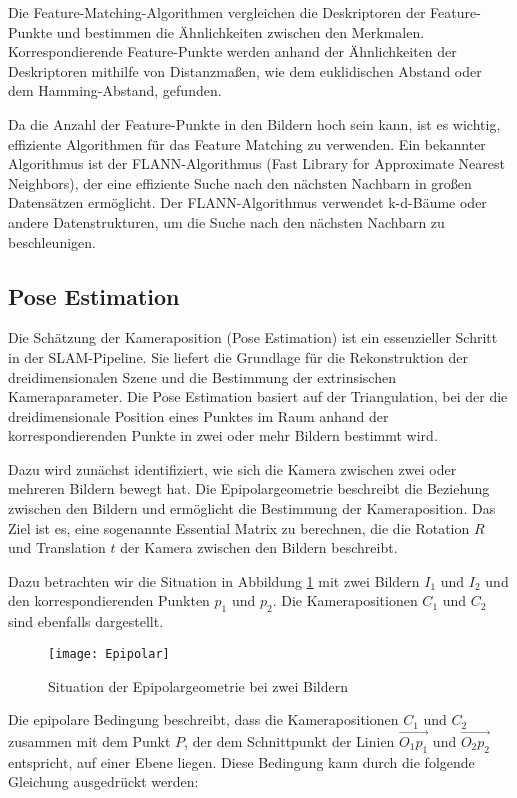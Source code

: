Die Feature-Matching-Algorithmen vergleichen die Deskriptoren der Feature-Punkte und bestimmen die Ähnlichkeiten zwischen den Merkmalen. Korrespondierende Feature-Punkte werden anhand der Ähnlichkeiten der Deskriptoren mithilfe von Distanzmaßen, wie dem euklidischen Abstand oder dem Hamming-Abstand, gefunden. 

Da die Anzahl der Feature-Punkte in den Bildern hoch sein kann, ist es wichtig, effiziente Algorithmen für das Feature Matching zu verwenden. Ein bekannter Algorithmus ist der FLANN-Algorithmus (Fast Library for Approximate Nearest Neighbors), der eine effiziente Suche nach den nächsten Nachbarn in großen Datensätzen ermöglicht. Der FLANN-Algorithmus verwendet k-d-Bäume oder andere Datenstrukturen, um die Suche nach den nächsten Nachbarn zu beschleunigen. 

\subsection{Pose Estimation}

Die Schätzung der Kameraposition (Pose Estimation) ist ein essenzieller Schritt in der SLAM-Pipeline. Sie liefert die Grundlage für die Rekonstruktion der dreidimensionalen Szene und die Bestimmung der extrinsischen Kameraparameter. Die Pose Estimation basiert auf der Triangulation, bei der die dreidimensionale Position eines Punktes im Raum anhand der korrespondierenden Punkte in zwei oder mehr Bildern bestimmt wird.

Dazu wird zunächst identifiziert, wie sich die Kamera zwischen zwei oder mehreren Bildern bewegt hat. Die Epipolargeometrie beschreibt die Beziehung zwischen den Bildern und ermöglicht die Bestimmung der Kameraposition.  Das Ziel ist es, eine sogenannte Essential Matrix zu berechnen, die die Rotation \( R \) und Translation \( t \) der Kamera zwischen den Bildern beschreibt.

Dazu betrachten wir die Situation in Abbildung \ref{fig:Epipolar} mit zwei Bildern \( I_1 \) und \( I_2 \) und den korrespondierenden Punkten \( p_1 \) und \( p_2 \). Die Kamerapositionen \( C_1 \) und \( C_2 \) sind ebenfalls dargestellt. 

\begin{figure}
    \centering
    \texttt{[image: Epipolar]}
    \caption{Situation der Epipolargeometrie bei zwei Bildern\label{fig:Epipolar}}\par
\end{figure}

Die epipolare Bedingung beschreibt, dass die Kamerapositionen \( C_1 \) und \( C_2 \) zusammen mit dem Punkt \( P \), der dem Schnittpunkt der Linien \( \overrightarrow{O_1p_1} \) und \( \overrightarrow{O_2p_2} \) entspricht, auf einer Ebene liegen. Diese Bedingung kann durch die folgende Gleichung ausgedrückt werden:

